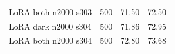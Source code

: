 \begin{table}[htbp]
\begin{tabular}{lrrr}
LoRA both n2000 s303 & %
500 & %
71.50 & %
72.50 \\ %

LoRA dark n2000 s304 & %
500 & %
71.86 & %
72.95 \\ %

LoRA both n2000 s304 & %
500 & %
72.80 & %
73.68 \\ %


\end{tabular}
\end{table}
